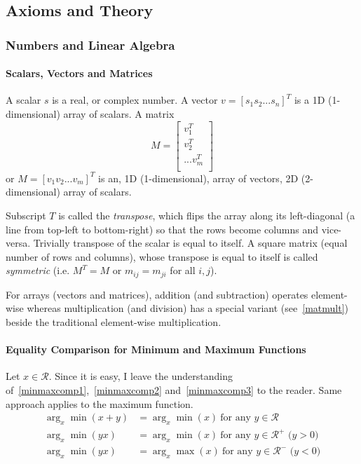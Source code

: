 \documentclass{article}
\numberwithin{equation}{subsection}
\begin{document}
\subsection{Axioms and Theory}
\subsubsection{Numbers and Linear Algebra}
\paragraph{Scalars, Vectors and Matrices}
\label{defn_svm}
A scalar $s$ is a real, or complex number. A vector $v = [s_1 s_2 ... s_n]^T$ is a 1D (1-dimensional) array of scalars. 
A matrix 
$$
M = \begin{bmatrix}
    v_1^T\\
    v_2^T\\
    ...
    v_m^T\\
\end{bmatrix}
$$
or $M = [v_1 v_2 ... v_m]^T$
is an, 1D (1-dimensional), array of vectors, 2D (2-dimensional) array of scalars. 

Subscript $T$ is called the \textit{transpose}, which flips the array along its left-diagonal (a line from top-left to bottom-right) so that the rows become columns and vice-versa. Trivially transpose of the scalar is equal to itself. A square matrix (equal number of rows and columns), whose transpose is equal to itself is called \textit{symmetric} (i.e. $M^T=M$ or $m_{ij} = m_{ji}$ for all $i, j$). 

For arrays (vectors and matrices), addition (and subtraction) operates element-wise whereas multiplication (and division) has a special variant (see~\ref{matmult}) beside the traditional element-wise multiplication.
\paragraph{Equality Comparison for Minimum and Maximum Functions}
Let $x \in \mathcal{R}$. Since it is easy, I leave the understanding of~\ref{minmaxcomp1},~\ref{minmaxcomp2} and~\ref{minmaxcomp3} to the reader. Same approach applies to the maximum function.
\begin{align}
    \arg_x\min(x+y) &= \arg_x\min(x)\ \text{for any $y \in \mathcal{R}$}\label{minmaxcomp1}\\
     \arg_x\min(yx) &= \arg_x\min(x)\ \text{for any $y \in \mathcal{R^+}$ ($y>0$)}\label{minmaxcomp2}\\
     \arg_x\min(yx) &= \arg_x\max(x)\ \text{for any $y \in \mathcal{R^-}$ ($y<0$)}\label{minmaxcomp3}
\end{align}
\end{document}
